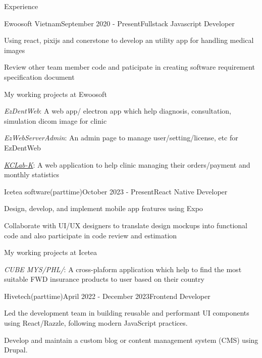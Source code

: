 \documentclass{resume}
\begin{document}
  \begin{rSection}{Experience}
    \begin{rSubsection}{Ewoosoft Vietnam}{September 2020 - Present}{Fullstack Javascript Developer}{}
      \item Using react, pixijs and conerstone to develop an utility app for handling medical images
      \item Review other team member code and paticipate in creating software requirement specification document 
    \end{rSubsection}

    \begin{rSubsection}{}{}{My working projects at Ewoosoft}{}
      \item {\emph{EzDentWeb}}: A web app/ electron app which help diagnosis, consultation, simulation dicom image for clinic
      \item {\emph{EzWebServerAdmin}}: An admin page to manage user/setting/license, etc for EzDentWeb
      \item \href{https://intro.kr.dentalcleverlab.com/}{\emph{KCLab-K}}: A web application to help clinic managing their orders/payment and monthly statistics
    \end{rSubsection}

    \newpage

    \begin{rSubsection}{Icetea software(parttime)}{October 2023 - Present}{React Native Developer}{}
      \item Design, develop, and implement mobile app features using Expo
      \item Collaborate with UI/UX designers to translate design mockups into functional code and also participate in code review and estimation
    \end{rSubsection}

    \begin{rSubsection}{}{}{My working projects at Icetea}{}
      \item {\emph{CUBE MYS/PHL/}}: A cross-plaform application which help to find the most suitable FWD insurance products to user based on their country
    \end{rSubsection}

    \begin{rSubsection}{Hivetech(parttime)}{April 2022 - December 2023}{Frontend Developer}{}
      \item Led the development team in building reusable and performant UI components using React/Razzle, following modern JavaScript practices.
      \item Develop and maintain a custom blog or content management system (CMS) using Drupal. 
    \end{rSubsection}


\end{rSection}
\end{document}
